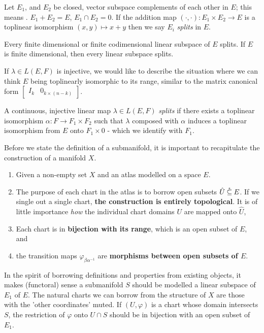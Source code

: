 \documentclass[../main-manifolds.tex]{subfiles}
\begin{document}
\begin{definition}[Splitting in $E$]\label{def:splitting-subspace}
Let $E_1$, and $E_2$ be closed, vector subspace complements of each other in $E$; this means . $E_1 + E_2 = E$, $E_1\cap E_2 = 0$. If the addition map $(\cdot,\cdot): E_1\times E_2\to E$ is a toplinear isomorphism $(x,y)\mapsto x + y$ then we say $E_i$ \emph{splits} in $E$.    
\end{definition}
\begin{remark}
Every finite dimensional or finite codimensional linear subspace of $E$ splits. If $E$ is finite dimensional, then every linear subspace splits.    
\end{remark}
If $\lambda\in L(E,F)$ is injective, we would like to describe the situation where we can think $E$ being toplinearly isomorphic to its range, similar to the matrix canonical form $\begin{bmatrix}I_{k} & 0_{k\times (n-k)} \end{bmatrix}$.
\begin{definition}[Splitting in $L(E,F)$]\label{def:splitting-clm}
A continuous, injective linear map $\lambda\in L(E,F)$ \emph{splits} if there exists a toplinear isomorphism $\alpha: F\to F_1\times F_2$ such that $\lambda$ composed with $\alpha$ induces a toplinear isomorphism from $E$ onto $F_1\times 0$ - which we identify with $F_1$.
\end{definition}
Before we state the definition of a submanifold, it is important to recapitulate the construction of a manifold $X$.
\begin{enumerate}
    \item Given a non-empty set $X$ and an atlas modelled on a space $E$.
    \item The purpose of each chart in the atlas is to borrow open subsets $\hat{U}\:\mathring{\subseteq}\: E$. If we single out a single chart, \textbf{the construction is entirely topological}. It is of little importance \emph{how} the individual chart domains $U$ are mapped onto $\hat{U}$,
    \item Each chart is in \textbf{bijection with its range}, which is an open subset of $E$, and
    \item the transition maps $\varphi_{\beta\alpha^{-1}}$ are \textbf{morphisms between open subsets of $E$}.
\end{enumerate}
In the spirit of borrowing definitions and properties from existing objects, it makes (functoral) sense a submanifold $S$ should be modelled a linear subspace of $E_1$ of $E$. The natural charts we can borrow from the structure of $X$ are those with the 'other coordinates' muted. If $(U,\varphi)$ is a chart whose domain intersects $S$, the restriction of $\varphi$ onto $U\cap S$ should be in bijection with an open subset of $E_1$. 
\end{document}
